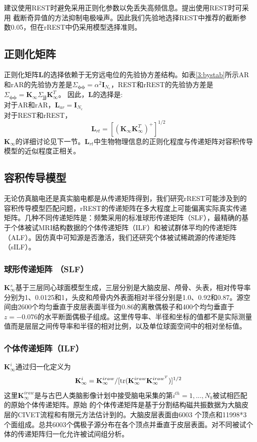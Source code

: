 \cite{yao_method_2001}建议使用REST时避免采用正则化参数以免丢失高频信息。\cite{zhai_y_and_yao_d_study_2004}提出使用REST时可采用
截断奇异值的方法抑制电极噪声。因此我们先验地选择REST中推荐的截断参数0.05，但在rREST中仍采用模型选择准则。
\subsection{正则化矩阵}
正则化矩阵$\mathbf{L}$的选择依赖于无穷远电位的先验协方差结构。如表\ref{3:bystab}所示AR和rAR的先验协方差是$\Sigma_{\mathbf{\phi\phi}}=\alpha^{2}\mathbf{I}_{N_e}$，REST和rREST的先验协方差是$\Sigma_{\mathbf{\phi\phi}}=\mathbf{K}_{\infty}\Sigma_{\mathbf{jj}}\mathbf{K}_{\infty}^T$。 因此，$\mathbf{L}$的选择是:\\
对于AR和rAR，$\mathbf{L}_{ar} =\mathbf{I}_{N_e}$\\
对于REST和rREST，
\begin{equation}\label{eq3.17}
\mathbf{L}_{rt} =[(\mathbf{K}_\infty\mathbf{K}_\infty^T)^+]^{1/2}
\end{equation}
$\mathbf{K}_\infty$的详细讨论见下一节。$\mathbf{L}_{rt}$中生物物理信息的正则化程度与传递矩阵对容积传导模型的近似程度正相关。
\subsection{容积传导模型}
无论仿真脑电还是真实脑电都是从传递矩阵得到，我们研究rREST可能涉及到的容积传导模型匹配问题，rREST的传递矩阵在多大程度上可能偏离实际真实传递矩阵。几种不同传递矩阵是：频繁采用的标准球形传递矩阵（SLF），最精确的基于个体被试MRI结构数据的个体传递矩阵（ILF）和被试群体平均的传递矩阵（ALF）。因仿真中可知源是否激活，我们还研究个体被试稀疏源的传递矩阵（sILF）。
\subsubsection{球形传递矩阵 （SLF）}
$\mathbf{K}_{\infty}^{s}$基于三层同心球面模型生成，三层分别是大脑皮层、颅骨、头表，相对传导率分别为1、0.0125和1，头皮和颅骨内外表面相对半径分别是1.0、0.92和0.87。源空间由2600个均匀垂直于皮层表面半径为0.86的离散偶极子和400个均匀垂直于$z=-0.076$的水平断面偶极子组成。这里传导率、半径和坐标的值都不是实际测量值而是层层之间传导率和半径的相对比例，以及单位球面空间中的相对坐标值。
\subsubsection{个体传递矩阵（ILF）}
$\mathbf{K}_{\infty}^i$通过归一化定义为
\begin{equation*}
\mathbf{K}_\infty^i=\mathbf{K}_\infty^{iraw}/{[\operatorname{tr}(\mathbf{K}_\infty^{iraw}\mathbf{K}_\infty^{{iraw}^T})]^{1/2}}
\end{equation*}
这里$\mathbf{K}_{\infty}^{iraw}$是与古巴人类脑影像计划中接受脑电采集的第$i^{th}=1,...,N_b$被试相匹配的原始个体传递矩阵。原始
的个体传递矩阵是基于分割结构磁共振数据为大脑皮层的CIVET流程和有限元方法估计到的。大脑皮层表面由6003
个顶点和11998*3个面组成。总共6003个偶极子源分布在各个顶点并垂直于皮层表面。对不同被试个体的传递矩阵归一化允许被试间组分析。


